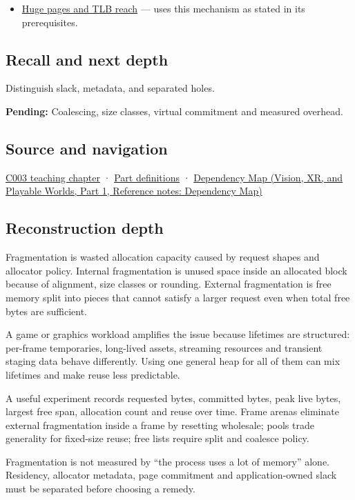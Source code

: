 \begin{itemize}
\tightlist
\item
  \hyperref[appendix-ce688d1acdab]{Huge pages and TLB reach} --- uses this mechanism as stated in its prerequisites.
\end{itemize}

\subsection{Recall and next depth}\label{appendix-a7c50686d81f-recall-and-next-depth}

\hypertarget{appendix-a7c50686d81f-recall-and-next-depth}{}

Distinguish slack, metadata, and separated holes.

\textbf{Pending:} Coalescing, size classes, virtual commitment and measured overhead.

\subsection{Source and navigation}\label{appendix-a7c50686d81f-source-and-navigation}

\hypertarget{appendix-a7c50686d81f-source-and-navigation}{}

\hyperref[01-foundations-i-ch002-where-the-bytes-live]{C003 teaching chapter} · \hyperref[appendix-fd090d982a15-m003---parts-41-60]{Part definitions} · \href{../07-Vision-XR-and-Playable-Worlds-P01/main.pdf\#nameddest=appendix-4ad47bdd269a}{Dependency Map (Vision, XR, and Playable Worlds, Part 1, Reference notes: Dependency Map)}

\subsection{Reconstruction depth}\label{appendix-a7c50686d81f-reconstruction-depth}

\hypertarget{appendix-a7c50686d81f-reconstruction-depth}{}

Fragmentation is wasted allocation capacity caused by request shapes and allocator policy. Internal fragmentation is unused space inside an allocated block because of alignment, size classes or rounding. External fragmentation is free memory split into pieces that cannot satisfy a larger request even when total free bytes are sufficient.

A game or graphics workload amplifies the issue because lifetimes are structured: per-frame temporaries, long-lived assets, streaming resources and transient staging data behave differently. Using one general heap for all of them can mix lifetimes and make reuse less predictable.

A useful experiment records requested bytes, committed bytes, peak live bytes, largest free span, allocation count and reuse over time. Frame arenas eliminate external fragmentation inside a frame by resetting wholesale; pools trade generality for fixed-size reuse; free lists require split and coalesce policy.

Fragmentation is not measured by ``the process uses a lot of memory'' alone. Residency, allocator metadata, page commitment and application-owned slack must be separated before choosing a remedy.

